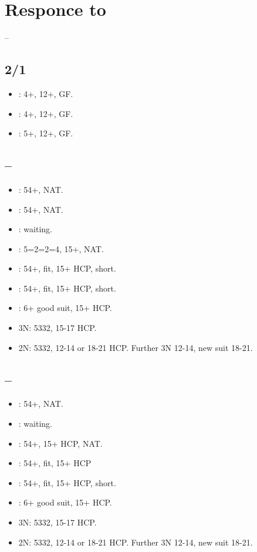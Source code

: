 \documentclass[12pt,twoside,a5paper]{report}%
\begin{document}
\chapter*{Responce to }
	-- \\
	\section*{2/1}
	\begin{itemize}
	\renewcommand{\labelitemi}{}
	\item {}: 4+\cl{}, 12+, GF.
	\item {}: 4+\di{}, 12+, GF.
	\item {}: 5+\he{}, 12+, GF.
	\end{itemize}

	\section*{--}
	\begin{itemize}
	\renewcommand{\labelitemi}{}
	\item {}: 5\sp{}4\di{}+, NAT.
	\item {}: 5\sp{}4\he{}+, NAT.
	\item {}: waiting.
	\item {}: 5=2=2=4, 15+, NAT.
	\item {}: 5\sp{}4\cl{}+, fit, 15+ HCP, short\di{}.
	\item {}: 5\sp{}4\cl{}+, fit, 15+ HCP, short\he{}.
	\item {}: 6\sp{}+ good suit, 15+ HCP.
	\item 3N: 5332, 15-17 HCP.
	\item 2N: 5332, 12-14 or 18-21 HCP. Further 3N 12-14, new suit 18-21.
	\end{itemize}

	\section*{--}
	\begin{itemize}
	\renewcommand{\labelitemi}{}
	\item {}: 5\sp{}4\he{}+, NAT.
	\item {}: waiting.
	\item {}: 5\he{}4\cl{}+, 15+ HCP, NAT.
	\item {}: 5\sp{}4\di{}+, fit, 15+ HCP
	\item {}: 5\sp{}4\di{}+, fit, 15+ HCP, short\he{}.
	\item {}: 6\sp{}+ good suit, 15+ HCP.
	\item 3N: 5332, 15-17 HCP.
	\item 2N: 5332, 12-14 or 18-21 HCP. Further 3N 12-14, new suit 18-21.
	\end{itemize}
\end{document}
